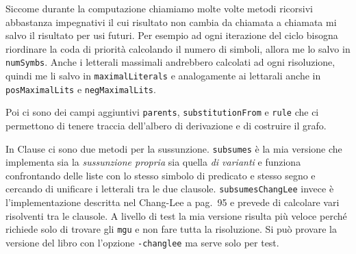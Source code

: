 \documentclass[a4paper,11pt]{article} %
\newcommand{\sintassi}{\texttt}
\newcommand{\classe}{\textsf}
\newcommand{\metodo}{\texttt}
\newcommand{\cod}{\lstset{basicstyle=\ttfamily}\lstinline}
\begin{document}
Siccome durante la computazione chiamiamo molte volte metodi ricorsivi 
abbastanza impegnativi il cui risultato non cambia da chiamata a chiamata
mi salvo il risultato per usi futuri.
%
Per esempio ad ogni iterazione del ciclo bisogna riordinare la coda di priorità
calcolando il numero di simboli,
allora me lo salvo in
\cod{numSymbs}.
Anche i letterali massimali %
andrebbero calcolati ad ogni risoluzione, quindi me li salvo in
\cod{maximalLiterals} e %
analogamente ai lettarali anche in \cod{posMaximalLits} e 
\cod{negMaximalLits}. %


Poi ci sono dei campi aggiuntivi \cod{parents}, \cod{substitutionFrom} e \cod{rule}
che ci permettono di tenere traccia dell'albero di derivazione e di costruire il
grafo.

In \classe{Clause} ci sono due metodi per la sussunzione. \metodo{subsumes} è la
mia versione che implementa sia la \emph{sussunzione propria} sia quella 
\emph{di varianti} e funziona confrontando delle liste con lo stesso simbolo di predicato e
stesso segno e cercando di unificare i letterali tra le due clausole.
\metodo{subsumesChangLee} invece è l'implementazione descritta nel Chang-Lee
a pag.~95 e prevede di calcolare vari risolventi tra le clausole.
A livello di test la mia versione risulta più veloce perché richiede solo di trovare
gli \metodo{mgu} e non fare tutta la risoluzione. %
Si può provare la versione del libro con %
l'opzione
\sintassi{-changlee} %
ma serve solo per test.
\end{document}

